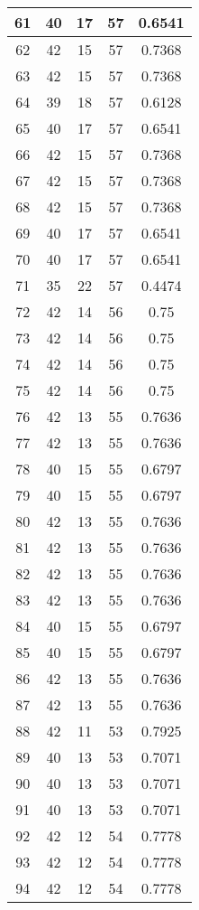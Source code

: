 \documentclass[letterpaper, 12pt]{article}
\begin{document}
\begin{longtable}{|c|c|c|c|c|}
61 & 40 & 17 & 57 & 0.6541 \\
\hline
62 & 42 & 15 & 57 & 0.7368 \\
\hline
63 & 42 & 15 & 57 & 0.7368 \\
\hline
64 & 39 & 18 & 57 & 0.6128 \\
\hline
65 & 40 & 17 & 57 & 0.6541 \\
\hline
66 & 42 & 15 & 57 & 0.7368 \\
\hline
67 & 42 & 15 & 57 & 0.7368 \\
\hline
68 & 42 & 15 & 57 & 0.7368 \\
\hline
69 & 40 & 17 & 57 & 0.6541 \\
\hline
70 & 40 & 17 & 57 & 0.6541 \\
\hline
71 & 35 & 22 & 57 & 0.4474 \\
\hline
72 & 42 & 14 & 56 & 0.75 \\
\hline
73 & 42 & 14 & 56 & 0.75 \\
\hline
74 & 42 & 14 & 56 & 0.75 \\
\hline
75 & 42 & 14 & 56 & 0.75 \\
\hline
76 & 42 & 13 & 55 & 0.7636 \\
\hline
77 & 42 & 13 & 55 & 0.7636 \\
\hline
78 & 40 & 15 & 55 & 0.6797 \\
\hline
79 & 40 & 15 & 55 & 0.6797 \\
\hline
80 & 42 & 13 & 55 & 0.7636 \\
\hline
81 & 42 & 13 & 55 & 0.7636 \\
\hline
82 & 42 & 13 & 55 & 0.7636 \\
\hline
83 & 42 & 13 & 55 & 0.7636 \\
\hline
84 & 40 & 15 & 55 & 0.6797 \\
\hline
85 & 40 & 15 & 55 & 0.6797 \\
\hline
86 & 42 & 13 & 55 & 0.7636 \\
\hline
87 & 42 & 13 & 55 & 0.7636 \\
\hline
88 & 42 & 11 & 53 & 0.7925 \\
\hline
89 & 40 & 13 & 53 & 0.7071 \\
\hline
90 & 40 & 13 & 53 & 0.7071 \\
\hline
91 & 40 & 13 & 53 & 0.7071 \\
\hline
92 & 42 & 12 & 54 & 0.7778 \\
\hline
93 & 42 & 12 & 54 & 0.7778 \\
\hline
94 & 42 & 12 & 54 & 0.7778 \\

\end{longtable}
\end{document}
